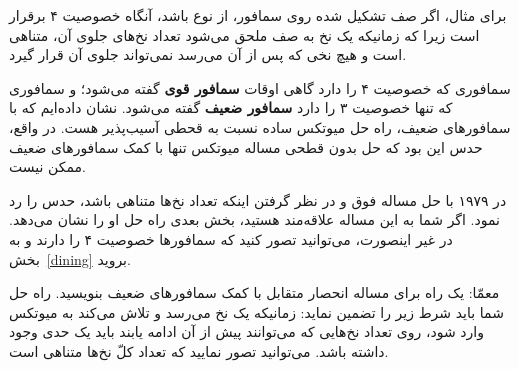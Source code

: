 \documentclass{book}
\begin{document}
    برای مثال، اگر صف تشکیل شده روی سمافور، از نوع   باشد،
    آنگاه خصوصیت ۴ برقرار است زیرا که زمانیکه یک نخ به صف ملحق می‌شود تعداد نخ‌های جلوی آن، متناهی است و هیچ نخی که پس از آن می‌رسد 
    نمی‌تواند جلوی آن قرار گیرد. 

    سمافوری که خصوصیت ۴ را دارد گاهی اوقات \textbf{سمافور قوی} گفته می‌شود؛ و 
    سمافوری که تنها خصوصیت ۳ را دارد \textbf{سمافور ضعیف} گفته می‌شود.
    نشان‌ داده‌ایم که  با سمافورهای ضعیف، راه حل میوتکس ساده نسبت به قحطی آسیب‌پذیر هست.
    در واقع، حدس  این بود که حل بدون قطحی مساله میوتکس تنها با کمک سمافورهای ضعیف ممکن نیست. 

    در ۱۹۷۹  با حل مساله فوق و در نظر گرفتن اینکه تعداد نخ‌ها متناهی باشد، حدس    را رد نمود\cite{morris}. 
    اگر شما به این مساله علاقه‌مند هستید، بخش بعدی راه حل او را نشان می‌دهد. در غیر اینصورت، می‌توانید تصور کنید که سمافورها خصوصیت ۴ 
    را دارند و به بخش~\ref{dining} بروید. 

    معمّا: یک راه برای مساله انحصار متقابل با کمک سمافورهای ضعیف بنویسید. راه حل شما باید شرط زیر را تضمین نماید: 
    زمانیکه یک نخ می‌رسد و تلاش می‌کند به میوتکس وارد شود،  روی تعداد نخ‌هایی که می‌توانند پیش از آن ادامه یابند باید یک حدی وجود داشته باشد. 
    می‌توانید تصور نمایید که تعداد کلّ نخ‌ها متناهی است. 
\end{document}
